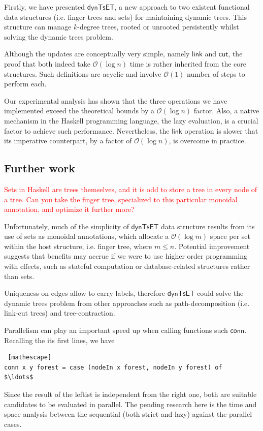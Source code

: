 \documentclass{elsarticle}
\newcommand{\code}[1]{\haskell{#1}}
\newcommand{\tcr} [1]{\textcolor{red}{#1}}
\newcommand{\MATHSF}[1]{\ensuremath{\mathsf{#1}}\xspace}
\newcommand{\link}{\MATHSF{link}}
\newcommand{\cut}{\MATHSF{cut}}
\newcommand{\conn}{\MATHSF{conn}}
\newcommand{\dyntset}{\MATHSF{dynTsET}}
\renewcommand{\O}{\ensuremath{\mathcal{O}}}
\begin{document}
Firstly, we have presented \dyntset, a new approach to two existent functional data structures (i.e. finger trees and sets) for maintaining dynamic trees. This structure can manage $k$-degree trees, rooted or unrooted persistently whilst solving the dynamic trees problem. 

Although the updates are conceptually very simple, namely \link and \cut, the proof that both indeed take $\O(\log n)$ time is rather inherited from the core structures. Such definitions are acyclic and involve $\O(1)$ number of steps to perform each. 

Our experimental analysis has shown that the three operations we have implemented exceed the theoretical bounds by a $\O(\log n)$ factor. Also, a native mechanism in the Haskell programming language, the lazy evaluation, is a crucial factor to achieve such performance. Nevertheless, the \link operation is slower that its imperative counterpart, by a factor of $\O(\log n)$, is overcome in practice.

\subsection{Further work}

\tcr{Sets in Haskell are trees themselves, and it is odd to store a tree in every node of a tree. Can you take the finger tree, specialized to this particular monoidal annotation, and optimize it further more?}

Unfortunately, much of the simplicity of \dyntset data structure results from its use of sets as monoidal annotations, which allocate a $\O(\log m)$ space per set within the host structure, i.e. finger tree, where $m \leq n$. Potential improvement suggests that benefits may accrue if we were to use higher order programming with effects, such as stateful computation or database-related structures rather than sets.

Uniqueness on edges allow to carry labels, therefore \dyntset could solve the dynamic trees problem from other approaches such as path-decomposition (i.e. link-cut trees) and tree-contraction. 

Parallelism can play an important speed up when calling functions such \conn. Recalling the its first lines, we have
\begin{lstlisting} [mathescape]
conn x y forest = case (nodeIn x forest, nodeIn y forest) of 
$\ldots$
\end{lstlisting}
Since the result of the leftist \code{nodeIn} is independent from the right one, both are suitable candidates to be evaluated in parallel. The pending research here is the time and space analysis between the sequential (both strict and lazy) against the parallel cases.
\end{document}
